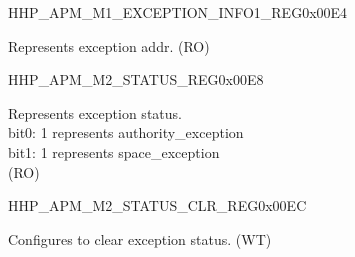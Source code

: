 \begin{register}{H}{HP\_APM\_M1\_EXCEPTION\_INFO1\_REG}{0x00E4}\label{regdesc:HPAPMM1EXCEPTIONINFO1REG}
%
\regnewline%
\begin{regdesc}\begin{reglist}
\label{fielddesc:HPAPMM1EXCEPTIONADDR}\item [HP\_APM\_M1\_EXCEPTION\_ADDR] Represents exception addr. (RO)
\end{reglist}\end{regdesc}
\end{register}


\begin{register}{H}{HP\_APM\_M2\_STATUS\_REG}{0x00E8}\label{regdesc:HPAPMM2STATUSREG}
%
%
\regnewline%
\begin{regdesc}\begin{reglist}
\label{fielddesc:HPAPMM2EXCEPTIONSTATUS}\item [HP\_APM\_M2\_EXCEPTION\_STATUS] Represents exception status.\\ 
bit0: 1 represents authority\_exception \\ 
bit1: 1 represents space\_exception  \\ (RO)
\end{reglist}\end{regdesc}
\end{register}


\begin{register}{H}{HP\_APM\_M2\_STATUS\_CLR\_REG}{0x00EC}\label{regdesc:HPAPMM2STATUSCLRREG}
%
%
\regnewline%
\begin{regdesc}\begin{reglist}
\label{fielddesc:HPAPMM2REGIONSTATUSCLR}\item [HP\_APM\_M2\_REGION\_STATUS\_CLR] Configures to clear exception status. (WT)
\end{reglist}\end{regdesc}
\end{register}


